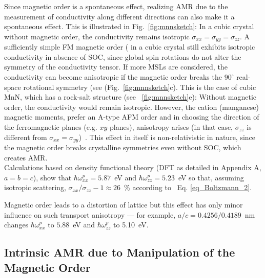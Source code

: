 \documentclass[prb,showpacs,amsmath,amssymb,superscriptaddress,twocolumn,floatfix]{revtex4-1}
\begin{document}
Since magnetic order is a spontaneous effect, realizing AMR due to the measurement of conductivity along different directions can also make it a spontaneous effect. This is illustrated in Fig.~\ref{fig:mnnsketch}: In a cubic crystal without magnetic order, the conductivity remains isotropic $\sigma_{xx}=\sigma_{yy}=\sigma_{zz}$. A {\color{blue} sufficiently simple} FM magnetic order ( in a cubic crystal still exhibits isotropic conductivity in absence of SOC, since global spin rotations do not alter the symmetry of the conductivity tensor. If more MSLs are considered, the conductivity can become anisotropic if the magnetic order breaks the $90^\circ$ real-space rotational symmetry (see (Fig.~\ref{fig:mnnsketch}c). This is the case of cubic MnN, which has a rock-salt structure (see ~\ref{fig:mnnsketch}e): Without magnetic order, the conductivity would remain isotropic. However, the cation (manganese) magnetic moments, prefer an A-type AFM order and in choosing
the direction of the ferromagnetic planes (e.g. $xy$-planes),
anisotropy arises (in that case, $\sigma_{zz}$ is different from
$\sigma_{xx}=\sigma_{yy}$)~\cite{Granville:2005}. This effect in itself is non-relativistic in nature, {\color{blue} since the magnetic order breaks crystalline symmetries even without SOC, which creates AMR}. \\

Calculations based on density functional theory (DFT as detailed in Appendix A, $a=b=c$), show that $\hbar\omega^p_{xx}=5.87$~eV and $\hbar\omega^p_{zz}=5.23$~eV so that, assuming isotropic scattering, $\sigma_{xx}/\sigma_{zz}-1\approx 26$~\% according to~ Eq. \ref{eq_Boltzmann_2}.

Magnetic order leads to a distortion of lattice but this effect has only minor influence on such transport anisotropy --- for example, $a/c=0.4256/0.4189$~nm changes $\hbar\omega^p_{xx}$ to $5.88$~eV and $\hbar\omega^p_{zz}$ to 5.10~eV.

\subsection{Intrinsic AMR due to Manipulation of the Magnetic Order}
\label{sec_I_Kagome}
\end{document}
